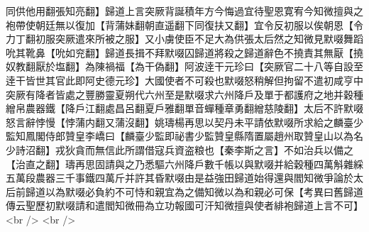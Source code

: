 同供他用翻張知亮翻】歸道上言突厥背誕積年方今悔過宜待聖恩寛宥今知微擅與之袍帶使朝廷無以復加【背蒲妹翻朝直遥翻下同復扶又翻】宜令反初服以俟朝恩【令力丁翻初服突厥遣來所被之服】又小虜使臣不足大為供張太后然之知微見默啜舞蹈吮其靴鼻【吮如兖翻】歸道長揖不拜默啜囚歸道將殺之歸道辭色不撓責其無厭【撓奴教翻厭於塩翻】為陳禍福【為干偽翻】阿波逹干元珍曰【突厥官二十八等自設至逹干皆世其官此即阿史德元珍】大國使者不可殺也默啜怒稍解但拘留不遣初咸亨中突厥有降者皆處之豐勝靈夏朔代六州至是默啜求六州降戶及單于都護府之地并穀種繒帛農器鐵【降戶江翻處昌呂翻夏戶雅翻單音蟬種章勇翻繒慈陵翻】太后不許默啜怒言辭悖慢【悖蒲内翻又蒲沒翻】姚璹楊再思以契丹未平請依默啜所求給之麟臺少監知鳳閣侍郎贊皇李嶠曰【麟臺少監即祕書少監贊皇縣隋置屬趙州取贊皇山以為名少詩沼翻】戎狄貪而無信此所謂借寇兵資盗粮也【秦李斯之言】不如治兵以備之【治直之翻】璹再思固請與之乃悉驅六州降戶數千帳以與默啜并給穀種四萬斛雜綵五萬段農器三千事鐵四萬斤并許其昏默啜由是益強田歸道始得還與閻知微爭論於太后前歸道以為默啜必負約不可恃和親宜為之備知微以為和親必可保【考異曰舊歸道傳云聖歷初默啜請和遣閻知微冊為立功報國可汗知微擅與使者緋袍歸道上言不可】<br />
<br />
